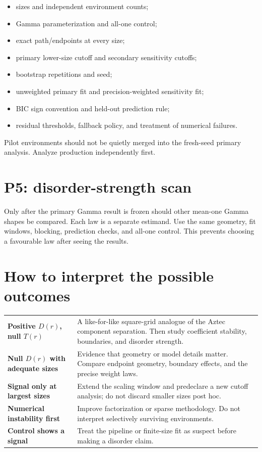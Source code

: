 \documentclass[11pt,a4paper,oneside,openany]{memoir}
\newcommand{\1}{\bm{1}}
\begin{document}
\begin{itemize}
  \item sizes and independent environment counts;
  \item Gamma parameterization and all-one control;
  \item exact path/endpoints at every size;
  \item primary lower-size cutoff and secondary sensitivity cutoffs;
  \item bootstrap repetitions and seed;
  \item unweighted primary fit and precision-weighted sensitivity fit;
  \item BIC sign convention and held-out prediction rule;
  \item residual thresholds, fallback policy, and treatment of numerical failures.
\end{itemize}

Pilot environments should not be quietly merged into the fresh-seed primary
analysis. Analyze production independently first.

\section{P5: disorder-strength scan}

Only after the primary Gamma result is frozen should other mean-one Gamma
shapes be compared. Each law is a separate estimand. Use the same geometry,
fit windows, blocking, prediction checks, and all-one control. This prevents
choosing a favourable law after seeing the results.

\section{How to interpret the possible outcomes}

\begin{tabularx}{\textwidth}{>{\bfseries\color{Navy}}p{} X}
Positive $D(r)$, null $T(r)$ & A like-for-like square-grid analogue of the Aztec component separation. Then study coefficient stability, boundaries, and disorder strength.\\
Null $D(r)$ with adequate sizes & Evidence that geometry or model details matter. Compare endpoint geometry, boundary effects, and the precise weight laws.\\
Signal only at largest sizes & Extend the scaling window and predeclare a new cutoff analysis; do not discard smaller sizes post hoc.\\
Numerical instability first & Improve factorization or sparse methodology. Do not interpret selectively surviving environments.\\
Control shows a signal & Treat the pipeline or finite-size fit as suspect before making a disorder claim.\\
\end{tabularx}
\end{document}
